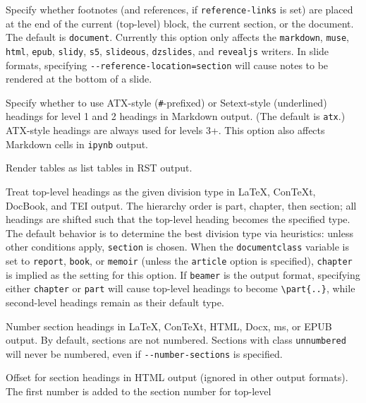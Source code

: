 \documentclass[
  a4paper,
]{article}
\begin{document}
\begin{description}
Specify whether footnotes (and references, if \texttt{reference-links}
is set) are placed at the end of the current (top-level) block, the
current section, or the document. The default is \texttt{document}.
Currently this option only affects the \texttt{markdown}, \texttt{muse},
\texttt{html}, \texttt{epub}, \texttt{slidy}, \texttt{s5},
\texttt{slideous}, \texttt{dzslides}, and \texttt{revealjs} writers. In
slide formats, specifying \texttt{-\/-reference-location=section} will
cause notes to be rendered at the bottom of a slide.
\item[\texttt{-\/-markdown-headings=setext}\textbar{}\texttt{atx}]
Specify whether to use ATX-style (\texttt{\#}-prefixed) or Setext-style
(underlined) headings for level 1 and 2 headings in Markdown output.
(The default is \texttt{atx}.) ATX-style headings are always used for
levels 3+. This option also affects Markdown cells in \texttt{ipynb}
output.
\item[\texttt{-\/-list-tables{[}=true\textbar{}false{]}}]
Render tables as list tables in RST output.
\item[\texttt{-\/-top-level-division=default}\textbar{}\texttt{section}\textbar{}\texttt{chapter}\textbar{}\texttt{part}]
Treat top-level headings as the given division type in LaTeX, ConTeXt,
DocBook, and TEI output. The hierarchy order is part, chapter, then
section; all headings are shifted such that the top-level heading
becomes the specified type. The default behavior is to determine the
best division type via heuristics: unless other conditions apply,
\texttt{section} is chosen. When the \texttt{documentclass} variable is
set to \texttt{report}, \texttt{book}, or \texttt{memoir} (unless the
\texttt{article} option is specified), \texttt{chapter} is implied as
the setting for this option. If \texttt{beamer} is the output format,
specifying either \texttt{chapter} or \texttt{part} will cause top-level
headings to become \texttt{\textbackslash{}part\{..\}}, while
second-level headings remain as their default type.
\item[\texttt{-N}, \texttt{-\/-number-sections}]
Number section headings in LaTeX, ConTeXt, HTML, Docx, ms, or EPUB
output. By default, sections are not numbered. Sections with class
\texttt{unnumbered} will never be numbered, even if
\texttt{-\/-number-sections} is specified.
\item[\texttt{-\/-number-offset=}\emph{NUMBER}{[}\texttt{,}\emph{NUMBER}\texttt{,}\emph{\ldots{}}{]}]
Offset for section headings in HTML output (ignored in other output
formats). The first number is added to the section number for top-level

\end{description}
\end{document}
